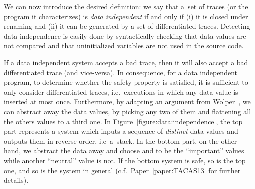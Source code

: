 %
We can now introduce the desired definition: we say that a~set of
traces (or the program it characterizes) is \emph{data independent} if
and only if (i) it is closed under renaming and (ii) it can be
generated by a set of differentiated traces.
%
Detecting data-independence is easily done by syntactically checking
that data values are not compared and that uninitialized variables are
not used in the source code.

If a data independent system accepts a bad trace, then it will also
accept a bad differentiated trace (and vice-versa).
%
In consequence, for a data independent program, to determine whether
the safety property is satisfied, it is sufficient to only consider
differentiated traces, i.e.\ executions in which any data value is
inserted at most once.
%
Furthermore, by adapting an argument from
Wolper~\cite{Wolper:dataindependence}, we can abstract away the data
values, by picking any two of them and flattening all the others
values to a third one.
%
In Figure~\ref{figure:data:independence}, the top part represents a
system which inputs a sequence of \emph{distinct} data values and
outputs them in reverse order, i.e\ a~stack.
%
In the bottom part, on the other hand, we abstract the data away and
choose  and  to be the ``important'' values
while another ``neutral'' value  is not.
%
If the bottom system is safe, so is the top one, and so is the system
in general (c.f.\ Paper~\ref{paper:TACAS13} for further details).
%
%
